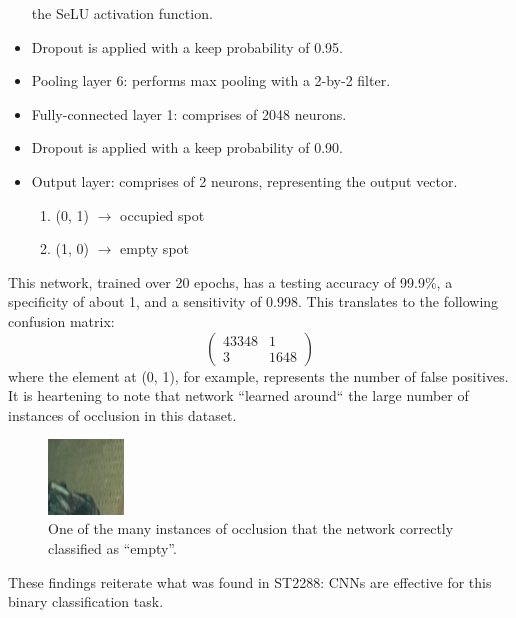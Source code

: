 \documentclass[a4paper, 11pt]{article} %
\begin{document}
\begin{itemize}
		the SeLU activation function.
		\item[] Dropout is applied with a keep probability of 0.95.
		\item[] Pooling layer 6: performs max pooling with a 2-by-2 filter.
		\item[] Fully-connected layer 1: comprises of 2048 neurons.
		\item[] Dropout is applied with a keep probability of 0.90.
		\item[] Output layer: comprises of 2 neurons, representing the output 
		vector.
		\vspace*{-4mm}
		\begin{enumerate}
			\setlength\itemsep{-3mm}
			\item[] (0, 1) $\rightarrow$ occupied spot
			\item[] (1, 0) $\rightarrow$ empty spot
		\end{enumerate}
	\end{itemize}
	This network, trained over 20 epochs, has a testing accuracy of 99.9\%, a specificity of about 1, and a
	sensitivity of 0.998. This translates to the following confusion matrix:
	\begin{equation}
	\nonumber
	\begin{pmatrix} 43348 & 1\\ 3 & 1648 \end{pmatrix}
	\end{equation}
	where the element at (0, 1), for example, represents the number of false 
	positives. It is heartening to note that network ``learned around`` the 
	large number of instances of occlusion in this dataset.
	\begin{figure}
		\centering
		\includegraphics[width=2cm]{figures/nuslot_occlusion}
		\caption{One of the many instances of occlusion that the network 
		correctly classified as ``empty''.}
	\end{figure}
	These findings reiterate what was found in ST2288: CNNs are effective for 
	this binary classification task. 

	
\end{document}
